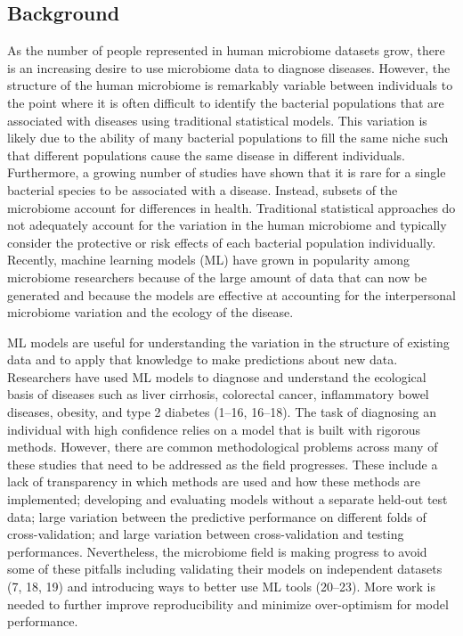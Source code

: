 \documentclass[11pt,]{article}
\begin{document}
\newpage

\subsection{Background}\label{background}

As the number of people represented in human microbiome datasets grow,
there is an increasing desire to use microbiome data to diagnose
diseases. However, the structure of the human microbiome is remarkably
variable between individuals to the point where it is often difficult to
identify the bacterial populations that are associated with diseases
using traditional statistical models. This variation is likely due to
the ability of many bacterial populations to fill the same niche such
that different populations cause the same disease in different
individuals. Furthermore, a growing number of studies have shown that it
is rare for a single bacterial species to be associated with a disease.
Instead, subsets of the microbiome account for differences in health.
Traditional statistical approaches do not adequately account for the
variation in the human microbiome and typically consider the protective
or risk effects of each bacterial population individually. Recently,
machine learning models (ML) have grown in popularity among microbiome
researchers because of the large amount of data that can now be
generated and because the models are effective at accounting for the
interpersonal microbiome variation and the ecology of the disease.

ML models are useful for understanding the variation in the structure of
existing data and to apply that knowledge to make predictions about new
data. Researchers have used ML models to diagnose and understand the
ecological basis of diseases such as liver cirrhosis, colorectal cancer,
inflammatory bowel diseases, obesity, and type 2 diabetes (1--16,
16--18). The task of diagnosing an individual with high confidence
relies on a model that is built with rigorous methods. However, there
are common methodological problems across many of these studies that
need to be addressed as the field progresses. These include a lack of
transparency in which methods are used and how these methods are
implemented; developing and evaluating models without a separate
held-out test data; large variation between the predictive performance
on different folds of cross-validation; and large variation between
cross-validation and testing performances. Nevertheless, the microbiome
field is making progress to avoid some of these pitfalls including
validating their models on independent datasets (7, 18, 19) and
introducing ways to better use ML tools (20--23). More work is needed to
further improve reproducibility and minimize over-optimism for model
performance.
\end{document}
